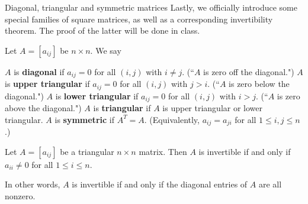 \begin{frame}{Diagonal, triangular and symmetric matrices}
Lastly, we officially introduce some special families of square matrices, as well as a corresponding invertibility theorem. The proof of the latter will be done in class. 
 \begin{definition} Let $A=[a_{ij}]$ be $n\times n$. We say  
 \begin{enumerate}[(i)]
\ii $A$ is {\bf diagonal} if $a_{ij}=0$ for all $(i,j)$ with $i\ne j$. (``$A$ is zero off the diagonal.")
\ii $A$ is {\bf upper triangular} if $a_{ij}=0$ for all $(i,j)$ with $j>i$. (``$A$ is zero below the diagonal.")
\ii $A$ is {\bf lower triangular} if $a_{ij}=0$ for all $(i,j)$ with $i>j$. (``$A$ is zero above the diagonal.")
\ii $A$ is {\bf triangular} if $A$ is upper triangular or lower triangular. 
\ii $A$ is {\bf symmetric} if $A^T=A$.  (Equivalently, $a_{ij}=a_{ji}$ for all $1\leq i,j\leq n$.) 
\end{enumerate}
 \end{definition}
 \pause
 \begin{theorem}
 Let $A=[a_{ij}]$ be a triangular $n\times n$ matrix. Then $A$ is invertible if and only if $a_{ii}\ne 0$ for all $1\leq i\leq n$.
 
In other words, $A$ is invertible if and only if the diagonal entries of $A$ are all nonzero. 
 \end{theorem}
\end{frame}
